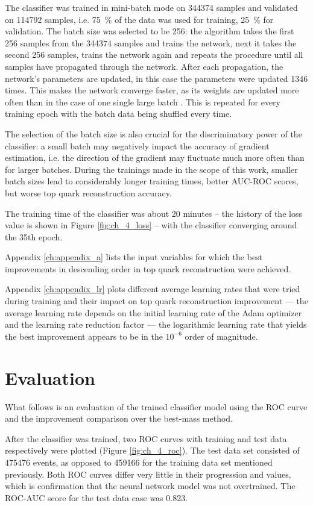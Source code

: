 The classifier was trained in mini-batch mode on \num{344374} samples and validated on \num{114792} samples, i.e. \SI{75}{\%} of the data was used for training, \SI{25}{\%} for validation. The batch size was selected to be 256: the algorithm takes the first 256 samples from the \num{344374} samples and trains the network, next it takes the second 256 samples, trains the network again and repeats the procedure until all samples have propagated through the network. After each propagation, the network's parameters are updated, in this case the parameters were updated \num{1346} times. This makes the network converge faster, as its weights are updated more often than in the case of one single large batch \cite{153535}. This is repeated for every training epoch with the batch data being shuffled every time.

The selection of the batch size is also crucial for the discriminatory power of the classifier: a small batch may negatively impact the accuracy of gradient estimation, i.e. the direction of the gradient may fluctuate much more often than for larger batches. During the trainings made in the scope of this work, smaller batch sizes lead to considerably longer training times, better AUC-ROC scores, but worse top quark reconstruction accuracy.

The training time of the classifier was about 20 minutes -- the history of the loss value is shown in Figure \ref{fig:ch_4_loss} -- with the classifier converging around the 35th epoch.

Appendix \ref{ch:appendix_a} lists the input variables for which the best improvements in descending order in top quark reconstruction were achieved.

Appendix \ref{ch:appendix_lr} plots different average learning rates that were tried during training and their impact on top quark reconstruction improvement --- the average learning rate depends on the initial learning rate of the Adam optimizer and the learning rate reduction factor --- the logarithmic learning rate that yields the best improvement appears to be in the $10^{-6}$ order of magnitude.

\section{Evaluation}
\label{sec:ch-4-eval}
What follows is an evaluation of the trained classifier model using the ROC curve and the improvement comparison over the best-mass method.

After the classifier was trained, two ROC curves with training and test data respectively were plotted (Figure \ref{fig:ch_4_roc}). The test data set consisted of \num{475476} events, as opposed to \num{459166} for the training data set mentioned previously. Both ROC curves differ very little in their progression and values, which is confirmation that the neural network model was not overtrained. The ROC-AUC score for the test data case was 0.823.

